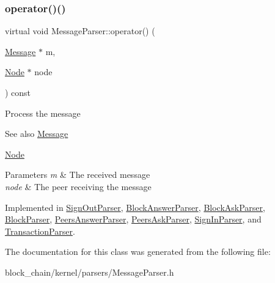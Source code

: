 \mbox{\label{classMessageParser_a946f3b936dc01a75d6165329b159ecfe}} 
\subsubsection{\texorpdfstring{operator()()}{operator()()}}
{\footnotesize\ttfamily virtual void Message\+Parser\+::operator() (\begin{DoxyParamCaption}\item[{\mbox{\hyperlink{classMessage}{Message}} $\ast$}]{m,  }\item[{\mbox{\hyperlink{classNode}{Node}} $\ast$}]{node }\end{DoxyParamCaption}) const\hspace{0.3cm}{\ttfamily [pure virtual]}}

Process the message \begin{DoxySeeAlso}{See also}
\mbox{\hyperlink{classMessage}{Message}} 

\mbox{\hyperlink{classNode}{Node}}
\end{DoxySeeAlso}

\begin{DoxyParams}{Parameters}
{\em m} & The received message \\
\hline
{\em node} & The peer receiving the message \\
\hline
\end{DoxyParams}


Implemented in \mbox{\hyperlink{classSignOutParser_a29ec80b982d783c10d46a431947bb319}{Sign\+Out\+Parser}}, \mbox{\hyperlink{classBlockAnswerParser_a984cd68ad8878777f86cf6ed0892dd1d}{Block\+Answer\+Parser}}, \mbox{\hyperlink{classBlockAskParser_a32d280786db26389f58175681ba35261}{Block\+Ask\+Parser}}, \mbox{\hyperlink{classBlockParser_acc2f5e6a6d3a30464454cfc85ff7ba9a}{Block\+Parser}}, \mbox{\hyperlink{classPeersAnswerParser_ad566095c0594805919e7e4d14f8b076e}{Peers\+Answer\+Parser}}, \mbox{\hyperlink{classPeersAskParser_ac52c9f42fa449029d49faaf9255b2d0d}{Peers\+Ask\+Parser}}, \mbox{\hyperlink{classSignInParser_aa73b5113c2c03361469149c456ef9cc0}{Sign\+In\+Parser}}, and \mbox{\hyperlink{classTransactionParser_addb18b5cb23a07ef6a46c4d89a1c9f23}{Transaction\+Parser}}.



The documentation for this class was generated from the following file\+:\begin{DoxyCompactItemize}
\item 
block\+\_\+chain/kernel/parsers/Message\+Parser.\+h\end{DoxyCompactItemize}
